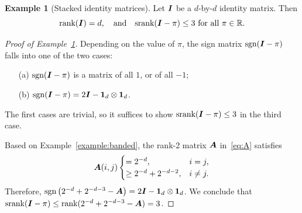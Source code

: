 \documentclass[twoside,11pt]{article}
\theoremstyle{plain}
\theoremstyle{definition}
\newtheorem{example}{Example}
\def\sign{\textup{sgn}}
\def\srank{\textup{srank}}
\def\rank{\textup{rank}}
\begin{document}
\begin{example}[Stacked identity matrices]\label{ex:identity}
Let $\bm I$ be a $d$-by-$d$ identity matrix. Then
\[
\rank(\mI)=d,\quad\text{and}\quad  \srank(\mI-\pi)\leq 3 \ \text{for all }\pi\in\mathbb{R}.
\]
\end{example}
\begin{proof}[Proof of Example~\ref{ex:identity}]
Depending on the value of $\pi$, the sign matrix $\sign(\mI-\pi)$ falls into one of the two cases: 
\begin{enumerate}
\item[(a)] $\sign(\mI-\pi)$ is a matrix of all $1$, or of all $-1$; 
\item[(b)] $\sign(\mI-\pi)=2\mI-\mathbf{1}_d\otimes \mathbf{1}_d$.
\end{enumerate}
The first cases are trivial, so it suffices to show $\srank(\mI-\pi)\leq 3$ in the third case.   


Based on Example~\ref{example:banded}, the rank-2 matrix $\bm A$ in~\eqref{eq:A} satisfies 
\[
\bm A(i,j)
\begin{cases}
=2^{-d}, & i=j,\\
\geq 2^{-d}+2^{-d-2}, & i\neq j.
\end{cases}
\]
Therefore, $\sign\left(2^{-d}+2^{-d-3}-\mA\right)=2\mI-\mathbf{1}_d\otimes \mathbf{1}_d$. We conclude that $\srank(\mI-\pi)\leq \rank(2^{-d}+2^{-d-3}-\mA)=3$. 
\end{proof}









\end{document}
